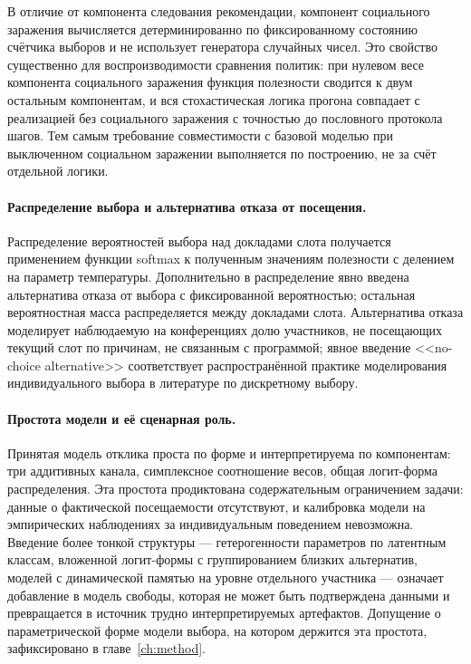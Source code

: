В отличие от компонента следования рекомендации, компонент социального заражения вычисляется детерминированно по фиксированному состоянию счётчика выборов и не использует генератора случайных чисел. Это свойство существенно для воспроизводимости сравнения политик: при нулевом весе компонента социального заражения функция полезности сводится к двум остальным компонентам, и вся стохастическая логика прогона совпадает с реализацией без социального заражения с точностью до пословного протокола шагов. Тем самым требование совместимости с базовой моделью при выключенном социальном заражении выполняется по построению, не за счёт отдельной логики.

\paragraph{Распределение выбора и альтернатива отказа от посещения.}
Распределение вероятностей выбора над докладами слота получается применением функции softmax к полученным значениям полезности с делением на параметр температуры. Дополнительно в распределение явно введена альтернатива отказа от выбора с фиксированной вероятностью; остальная вероятностная масса распределяется между докладами слота. Альтернатива отказа моделирует наблюдаемую на конференциях долю участников, не посещающих текущий слот по причинам, не связанным с программой; явное введение <<no-choice alternative>> соответствует распространённой практике моделирования индивидуального выбора в литературе по дискретному выбору.

\paragraph{Простота модели и её сценарная роль.}
Принятая модель отклика проста по форме и интерпретируема по компонентам: три аддитивных канала, симплексное соотношение весов, общая логит-форма распределения. Эта простота продиктована содержательным ограничением задачи: данные о фактической посещаемости отсутствуют, и калибровка модели на эмпирических наблюдениях за индивидуальным поведением невозможна. Введение более тонкой структуры --- гетерогенности параметров по латентным классам, вложенной логит-формы с группированием близких альтернатив, моделей с динамической памятью на уровне отдельного участника --- означает добавление в модель свободы, которая не может быть подтверждена данными и превращается в источник трудно интерпретируемых артефактов. Допущение о параметрической форме модели выбора, на котором держится эта простота, зафиксировано в главе~\ref{ch:method}.

